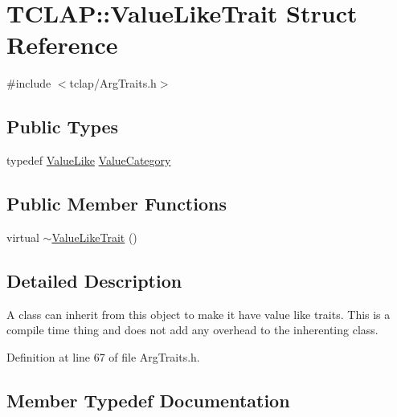 \hypertarget{struct_t_c_l_a_p_1_1_value_like_trait}{}\section{T\+C\+L\+A\+P\+:\+:Value\+Like\+Trait Struct Reference}
\label{struct_t_c_l_a_p_1_1_value_like_trait}


{\ttfamily \#include $<$tclap/\+Arg\+Traits.\+h$>$}

\subsection*{Public Types}
\begin{DoxyCompactItemize}
\item 
typedef \hyperlink{struct_t_c_l_a_p_1_1_value_like}{Value\+Like} \hyperlink{struct_t_c_l_a_p_1_1_value_like_trait_aac4ee14f65926b8e741d797a8900a79a}{Value\+Category}
\end{DoxyCompactItemize}
\subsection*{Public Member Functions}
\begin{DoxyCompactItemize}
\item 
virtual \hyperlink{struct_t_c_l_a_p_1_1_value_like_trait_a829a0e0f46e61916f6c8aa6ee441df38}{$\sim$\+Value\+Like\+Trait} ()
\end{DoxyCompactItemize}


\subsection{Detailed Description}
A class can inherit from this object to make it have value like traits. This is a compile time thing and does not add any overhead to the inherenting class. 

Definition at line 67 of file Arg\+Traits.\+h.



\subsection{Member Typedef Documentation}
\hypertarget{struct_t_c_l_a_p_1_1_value_like_trait_aac4ee14f65926b8e741d797a8900a79a}{}
